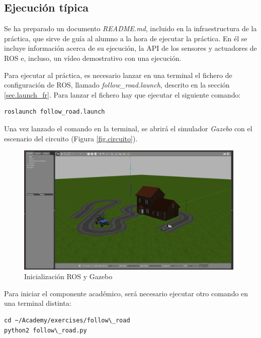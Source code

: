 \subsection{Ejecución típica}
Se ha preparado un documento \textit{README.md}, incluido en la infraestructura de la práctica, que sirve de guía al alumno a la hora de ejecutar la práctica. En él se incluye información acerca de su ejecución, la API de los sensores y actuadores de ROS e, incluso, un vídeo demostrativo con una ejecución.

Para ejecutar al práctica, es necesario lanzar en una terminal el fichero de configuración de ROS, llamado \textit{follow\_road.launch}, descrito en la sección \ref{sec.launch_fr}. Para lanzar el fichero hay que ejecutar el siguiente comando:

\lstset{language=bash, breaklines=true, basicstyle=\footnotesize}
\begin{lstlisting}[frame=single]
roslaunch follow_road.launch
\end{lstlisting}

Una vez lanzado el comando en la terminal, se abrirá el simulador \textit{Gazebo} con el escenario del circuito (Figura \ref{fig.circuito}).

\begin{figure}[H]
  \begin{center}
    \includegraphics[width=0.98\textwidth]{figures/roslaunch_fr.png}
		\caption{Inicialización ROS y Gazebo}
		\label{fig.roslaunchfr}
		\end{center}
\end{figure}

Para iniciar el componente académico, será necesario ejecutar otro comando en una terminal distinta:

\lstset{language=bash, breaklines=true, basicstyle=\footnotesize}
\begin{lstlisting}[frame=single]
cd ~/Academy/exercises/follow\_road
python2 follow\_road.py
\end{lstlisting}

